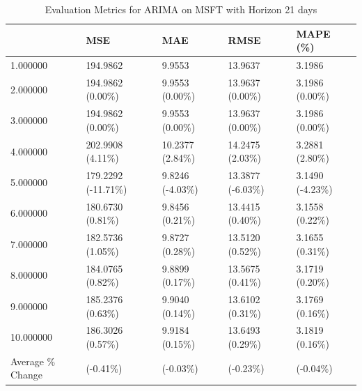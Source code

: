 \begin{table}
\caption{Evaluation Metrics for ARIMA on MSFT with Horizon 21 days}
\label{tab:arima_MSFT_h21_metrics}
\begin{tabular}{lllll}
\toprule
 & MSE & MAE & RMSE & MAPE (\%) \\
\midrule
1.000000 & 194.9862 & 9.9553 & 13.9637 & 3.1986 \\
2.000000 & 194.9862 (0.00\%) & 9.9553 (0.00\%) & 13.9637 (0.00\%) & 3.1986 (0.00\%) \\
3.000000 & 194.9862 (0.00\%) & 9.9553 (0.00\%) & 13.9637 (0.00\%) & 3.1986 (0.00\%) \\
4.000000 & 202.9908 (4.11\%) & 10.2377 (2.84\%) & 14.2475 (2.03\%) & 3.2881 (2.80\%) \\
5.000000 & 179.2292 (-11.71\%) & 9.8246 (-4.03\%) & 13.3877 (-6.03\%) & 3.1490 (-4.23\%) \\
6.000000 & 180.6730 (0.81\%) & 9.8456 (0.21\%) & 13.4415 (0.40\%) & 3.1558 (0.22\%) \\
7.000000 & 182.5736 (1.05\%) & 9.8727 (0.28\%) & 13.5120 (0.52\%) & 3.1655 (0.31\%) \\
8.000000 & 184.0765 (0.82\%) & 9.8899 (0.17\%) & 13.5675 (0.41\%) & 3.1719 (0.20\%) \\
9.000000 & 185.2376 (0.63\%) & 9.9040 (0.14\%) & 13.6102 (0.31\%) & 3.1769 (0.16\%) \\
10.000000 & 186.3026 (0.57\%) & 9.9184 (0.15\%) & 13.6493 (0.29\%) & 3.1819 (0.16\%) \\
Average \% Change & (-0.41\%) & (-0.03\%) & (-0.23\%) & (-0.04\%) \\
\bottomrule
\end{tabular}
\end{table}
